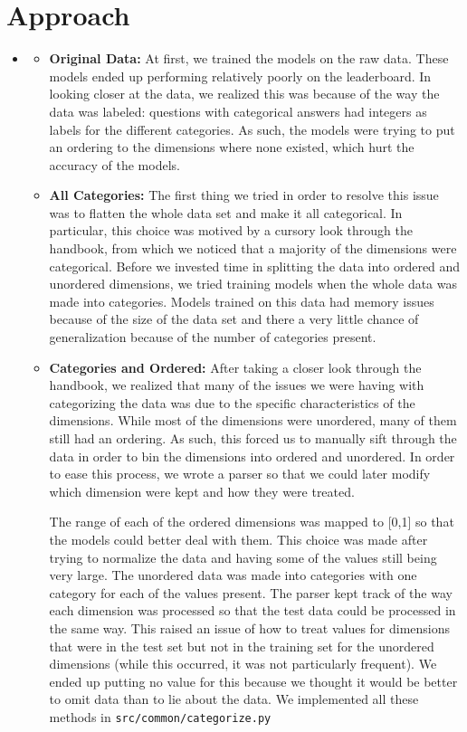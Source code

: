 \section{Approach}
\medskip
\begin{itemize}

    \item {}
    \begin{itemize}
    \item \textbf{Original Data:} At first, we trained the models on the raw data. These models ended up performing relatively poorly on the leaderboard. In looking closer at the data, we realized this was because of the way the data was labeled: questions with categorical answers had integers as labels for the different categories. As such, the models were trying to put an ordering to the dimensions where none existed, which hurt the accuracy of the models.

    \item \textbf{All Categories:} The first thing we tried in order to resolve this issue was to flatten the whole data set and make it all categorical. In particular, this choice was motived by a cursory look through the handbook, from which we noticed that a majority of the dimensions were categorical. Before we invested time in splitting the data into ordered and unordered dimensions, we tried training models when the whole data was made into categories. Models trained on this data had memory issues because of the size of the data set and there a very little chance of generalization because of the number of categories present.

    \item \textbf{Categories and Ordered:} After taking a closer look through the handbook, we realized that many of the issues we were having with categorizing the data was due to the specific characteristics of the dimensions. While most of the dimensions were unordered, many of them still had an ordering. As such, this forced us to manually sift through the data in order to bin the dimensions into ordered and unordered. In order to ease this process, we wrote a parser so that we could later modify which dimension were kept and how they were treated.
    
    \hspace{8mm} The range of each of the ordered dimensions was mapped to [0,1] so that the models could better deal with them. This choice was made after trying to normalize the data and having some of the values still being very large. The unordered data was made into categories with one category for each of the values present. The parser kept track of the way each dimension was processed so that the test data could be processed in the same way. This raised an issue of how to treat values for dimensions that were in the test set but not in the training set for the unordered dimensions (while this occurred, it was not particularly frequent). We ended up putting no value for this because we thought it would be better to omit data than to lie about the data. We implemented all these methods in \texttt{src/common/categorize.py}
    

\end{itemize}
\end{itemize}
